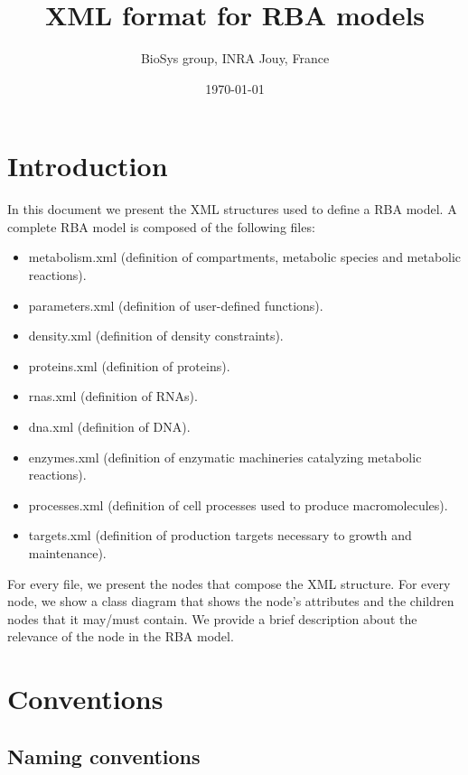 \documentclass[12pt]{scrartcl}
\begin{document}
\title{XML format for RBA models}
\author{BioSys group, INRA Jouy, France}
\date{\today}

\maketitle

\newpage

\tableofcontents

\newpage

\section{Introduction}

In this document we present the XML structures used to define a RBA model.
A complete RBA model is composed of the following files:
\begin{itemize}
  \item metabolism.xml
  (definition of compartments, metabolic species and metabolic reactions).
  \item parameters.xml
  (definition of user-defined functions).
  \item density.xml (definition of density constraints).
  \item proteins.xml (definition of proteins).
  \item rnas.xml (definition of RNAs).
  \item dna.xml (definition of DNA).
  \item enzymes.xml
  (definition of enzymatic machineries catalyzing metabolic reactions).
  \item processes.xml
  (definition of cell processes used to produce macromolecules).
  \item targets.xml
  (definition of production targets necessary to growth and maintenance).
\end{itemize}

For every file, we present the nodes that compose the XML structure.
For every node, we show a class diagram that shows the node's attributes
and the children nodes that it may/must contain.
We provide a brief description about the relevance of the node
in the RBA model.


\section{Conventions}

\subsection{Naming conventions}
\end{document}

